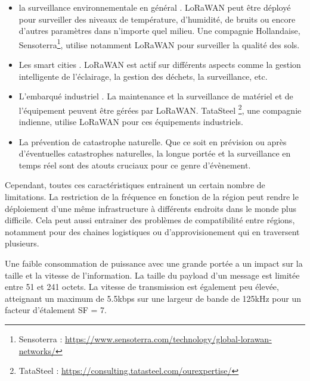 \begin{itemize}

\item la surveillance environnementale en général \cite{lorauc1}. LoRaWAN peut être déployé pour surveiller des niveaux de température, d'humidité, de bruits ou encore d'autres paramètres dans n'importe quel milieu. Une compagnie Hollandaise, Sensoterra\footnote{Sensoterra : \href{https://www.sensoterra.com/technology/global-lorawan-networks/}{https://www.sensoterra.com/technology/global-lorawan-networks/}}, utilise notamment LoRaWAN pour surveiller la qualité des sols.
\item Les smart cities \cite{lorauc2}. LoRaWAN est actif sur différents aspects comme la gestion intelligente de l'éclairage, la gestion des déchets, la surveillance, etc.
\item L'embarqué industriel \cite{lorauc3}. La maintenance et la surveillance de matériel et de l'équipement peuvent être gérées par LoRaWAN. TataSteel \footnote{TataSteel : \href{https://consulting.tatasteel.com/our_expertise/plant-infrastructure-and-logistics/}{https://consulting.tatasteel.com/ourexpertise/}}, une compagnie indienne, utilise LoRaWAN pour ces équipements industriels.
\item La prévention de catastrophe naturelle. Que ce soit en prévision\cite{lorauc41} ou après\cite{lorauc43} d'éventuelles catastrophes naturelles, la longue portée et la surveillance en temps réel sont des atouts cruciaux pour ce genre d'évènement.
\end{itemize}

\vspace{0.1cm}

Cependant, toutes ces caractéristiques entrainent un certain nombre de limitations. La restriction de la fréquence en fonction de la région peut rendre le déploiement d'une même infrastructure à différents endroits dans le monde plus difficile. Cela peut aussi entrainer des problèmes de compatibilité entre régions, notamment pour des chaines logistiques ou d'approvisionement qui en traversent plusieurs.

\vspace{0.1cm}

Une faible consommation de puissance avec une grande portée a un impact sur la taille et la vitesse de l'information. La taille du payload d'un message est limitée entre 51 et 241 octets. La vitesse de transmission est également peu élevée, atteignant un maximum de 5.5kbps sur une largeur de bande de 125kHz pour un facteur d'étalement SF = 7.

